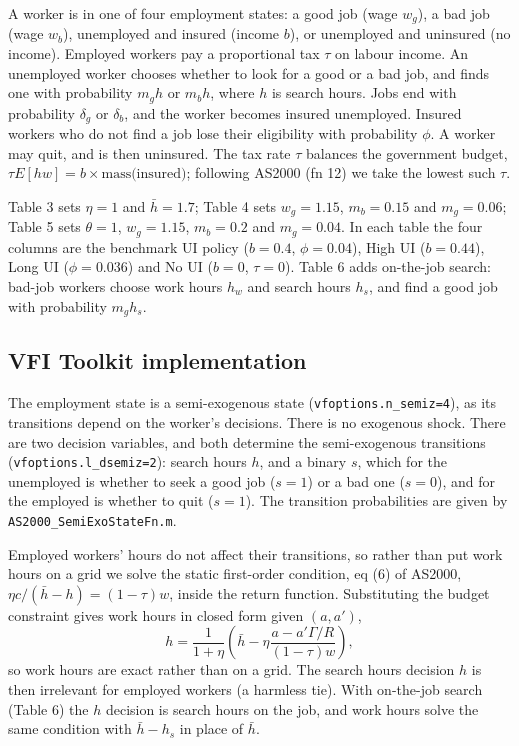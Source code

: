 \documentclass[11pt,fleqn]{article}
\begin{document}
A worker is in one of four employment states: a good job (wage $w_g$), a bad job (wage $w_b$), unemployed and insured (income $b$), or unemployed and uninsured (no income). Employed workers pay a proportional tax $\tau$ on labour income. An unemployed worker chooses whether to look for a good or a bad job, and finds one with probability $m_g h$ or $m_b h$, where $h$ is search hours. Jobs end with probability $\delta_g$ or $\delta_b$, and the worker becomes insured unemployed. Insured workers who do not find a job lose their eligibility with probability $\phi$. A worker may quit, and is then uninsured. The tax rate $\tau$ balances the government budget, $\tau E[hw] = b \times \text{mass(insured)}$; following AS2000 (fn 12) we take the lowest such $\tau$.

Table 3 sets $\eta=1$ and $\bar{h}=1.7$; Table 4 sets $w_g=1.15$, $m_b=0.15$ and $m_g=0.06$; Table 5 sets $\theta=1$, $w_g=1.15$, $m_b=0.2$ and $m_g=0.04$. In each table the four columns are the benchmark UI policy ($b=0.4$, $\phi=0.04$), High UI ($b=0.44$), Long UI ($\phi=0.036$) and No UI ($b=0$, $\tau=0$). Table 6 adds on-the-job search: bad-job workers choose work hours $h_w$ and search hours $h_s$, and find a good job with probability $m_g h_s$.


\subsection{VFI Toolkit implementation}

The employment state is a semi-exogenous state (\verb|vfoptions.n_semiz=4|), as its transitions depend on the worker's decisions. There is no exogenous shock. There are two decision variables, and both determine the semi-exogenous transitions (\verb|vfoptions.l_dsemiz=2|): search hours $h$, and a binary $s$, which for the unemployed is whether to seek a good job ($s=1$) or a bad one ($s=0$), and for the employed is whether to quit ($s=1$). The transition probabilities are given by \verb|AS2000_SemiExoStateFn.m|.

Employed workers' hours do not affect their transitions, so rather than put work hours on a grid we solve the static first-order condition, eq (6) of AS2000, $\eta c/(\bar{h}-h) = (1-\tau)w$, inside the return function. Substituting the budget constraint gives work hours in closed form given $(a,a')$,
\begin{equation*}
h = \frac{1}{1+\eta}\left(\bar{h} - \eta\frac{a - a'\Gamma/R}{(1-\tau)w}\right),
\end{equation*}
so work hours are exact rather than on a grid. The search hours decision $h$ is then irrelevant for employed workers (a harmless tie). With on-the-job search (Table 6) the $h$ decision is search hours on the job, and work hours solve the same condition with $\bar{h}-h_s$ in place of $\bar{h}$.
\end{document}
